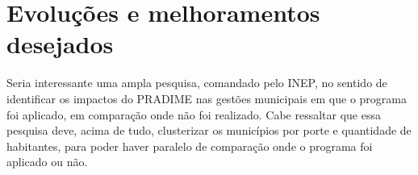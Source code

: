 \documentclass[
	12pt,				%
	openright,			%
	oneside,
	a4paper,			%
	chapter=TITLE,		%
	section=TITLE,		%
	sumario=abnt-6027-2012,
	english,			%
	brazil				%
]{abntex2}
\newcommand{\ImprimirSimOuNao}[2][Sim]
{
  \ifthenelse{\equal{#1}{Sim}}{#2}{}
}
\begin{document}
	\section{Evoluções e melhoramentos desejados}
	
		Seria interessante uma ampla pesquisa, comandado pelo INEP, no sentido de identificar os impactos do PRADIME nas gestões municipais em que o programa foi aplicado, em comparação onde não foi realizado.
		Cabe ressaltar que essa pesquisa deve, acima de tudo, clusterizar os municípios por porte e quantidade de habitantes, para poder haver paralelo de comparação onde o programa foi aplicado ou não.





\label{___:bibliografia}








\postextual



	\ImprimirSimOuNao[Não]{             %
		\glossary
	}



\end{document}
